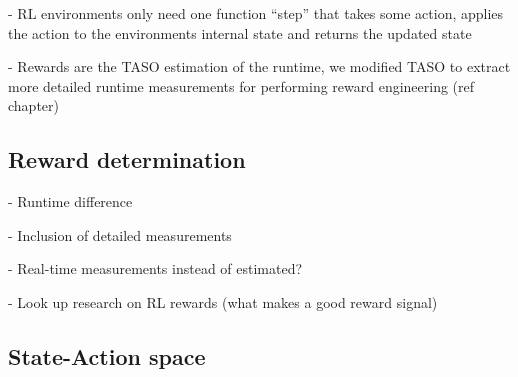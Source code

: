 - RL environments only need one function ``step'' that takes some action, applies the action to the environments internal state and returns the updated state

- Rewards are the TASO estimation of the runtime, we modified TASO to extract more detailed runtime measurements for performing reward engineering (ref chapter)

\subsection{Reward determination}

- Runtime difference

- Inclusion of detailed measurements

- Real-time measurements instead of estimated?

- Look up research on RL rewards (what makes a good reward signal)

\subsection{State-Action space}
